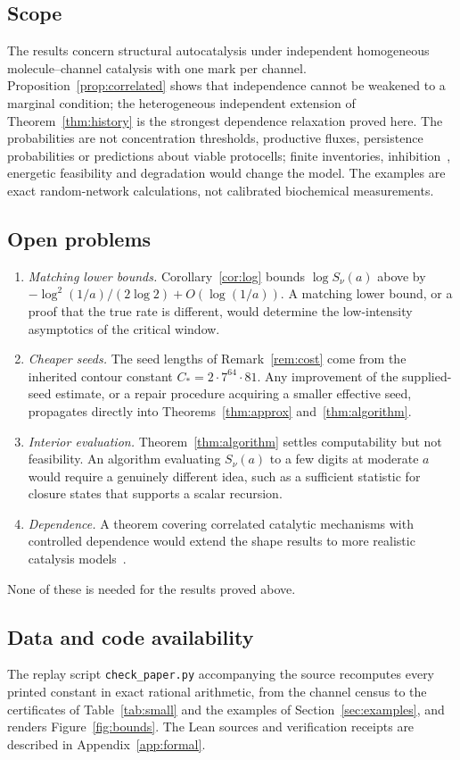 \documentclass[11pt,a4paper]{article}
\theoremstyle{plain}
\theoremstyle{definition}
\theoremstyle{remark}
\begin{document}
\subsection*{Scope}
The results concern structural autocatalysis under independent homogeneous molecule--channel catalysis with one mark per channel. Proposition~\ref{prop:correlated} shows that independence cannot be weakened to a marginal condition; the heterogeneous independent extension of Theorem~\ref{thm:history} is the strongest dependence relaxation proved here. The probabilities are not concentration thresholds, productive fluxes, persistence probabilities or predictions about viable protocells; finite inventories, inhibition~\cite{hordijk2012structure}, energetic feasibility and degradation would change the model. The examples are exact random-network calculations, not calibrated biochemical measurements.

\subsection*{Open problems}
\begin{enumerate}[leftmargin=2em]
\item \emph{Matching lower bounds.} Corollary~\ref{cor:log} bounds $\log S_\nu(a)$ above by $-\log^2(1/a)/(2\log2)+O(\log(1/a))$. A matching lower bound, or a proof that the true rate is different, would determine the low-intensity asymptotics of the critical window.
\item \emph{Cheaper seeds.} The seed lengths of Remark~\ref{rem:cost} come from the inherited contour constant $C_*=2\cdot7^{64}\cdot81$. Any improvement of the supplied-seed estimate, or a repair procedure acquiring a smaller effective seed, propagates directly into Theorems~\ref{thm:approx} and~\ref{thm:algorithm}.
\item \emph{Interior evaluation.} Theorem~\ref{thm:algorithm} settles computability but not feasibility. An algorithm evaluating $S_\nu(a)$ to a few digits at moderate $a$ would require a genuinely different idea, such as a sufficient statistic for closure states that supports a scalar recursion.
\item \emph{Dependence.} A theorem covering correlated catalytic mechanisms with controlled dependence would extend the shape results to more realistic catalysis models~\cite{hordijk2016variable}.
\end{enumerate}
None of these is needed for the results proved above.

\subsection*{Data and code availability}
The replay script \texttt{check\_paper.py} accompanying the source recomputes every printed constant in exact rational arithmetic, from the channel census to the certificates of Table~\ref{tab:small} and the examples of Section~\ref{sec:examples}, and renders Figure~\ref{fig:bounds}. The Lean sources and verification receipts are described in Appendix~\ref{app:formal}.
\end{document}

